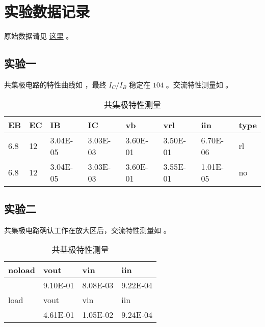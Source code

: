 \documentclass[lang=cn,11pt,a4paper,cite=authoryear]{elegantpaper}
\begin{document}


\section{实验数据记录}

原始数据请见 \href{https://github.com/PannenetsF/Mirco-Electronic-Device-Experiment/tree/main/homework/hw12}{这里} 。

\subsection{实验一}

共集极电路的特性曲线如  ，最终 \(I_C/I_B\) 稳定在 \(104\) 。交流特性测量如  。


\begin{table}[htb]
\centering
\caption{共集极特性测量}
\label{t1}
\begin{tabular}{|l|l|l|l|l|l|l|l|}
\hline
EB  & EC & IB       & IC       & vb       & vrl      & iin      & type \\ \hline
6.8 & 12 & 3.04E-05 & 3.03E-03 & 3.60E-01 & 3.50E-01 & 6.70E-06 & rl   \\ \hline
6.8 & 12 & 3.04E-05 & 3.03E-03 & 3.60E-01 & 3.55E-01 & 1.01E-05 & no   \\ \hline
\end{tabular}
\end{table}

\subsection{实验二}

共集极电路确认工作在放大区后，交流特性测量如  。

\begin{table}[htb]
\centering
\caption{共基极特性测量}
\label{t2}
\begin{tabular}{|l|l|l|l|}
\hline
noload & vout     & vin      & iin      \\ \hline
       & 9.10E-01 & 8.08E-03 & 9.22E-04 \\ \hline
load   & vout     & vin      & iin      \\ \hline
       & 4.61E-01 & 1.05E-02 & 9.24E-04 \\ \hline
\end{tabular}
\end{table}
\end{document}
